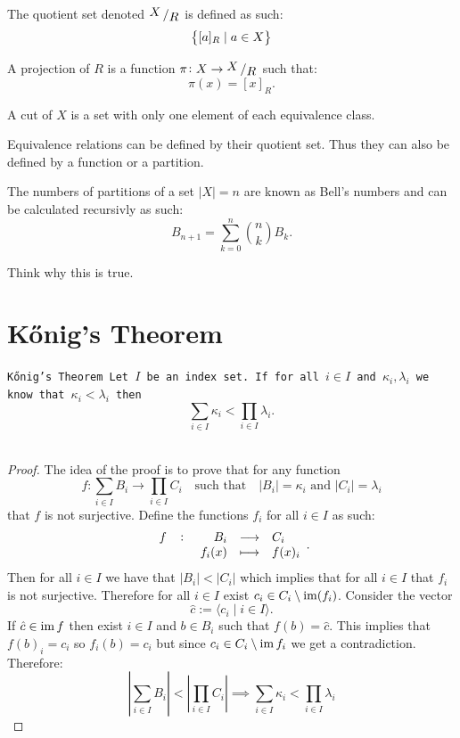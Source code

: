 \documentclass[11pt,a4paper]{article}
\begin{document}
    \begin{definition}
			The quotient set denoted $\bigslant{X}{R}$ is defined as such:
			\[
        \set{[a]_R \mid a \in X}
			\]
		\end{definition}

    \begin{definition}[Projection]
			A projection of $R$ is a function $\pi \colon X \to \bigslant{X}{R}$
      such that:
			\[
				\pi(x) = [x]_R.
			\]
		\end{definition}

    \begin{definition}[Cut]
			A cut of $X$ is a set with only one element of each 
			equivalence class.
		\end{definition}
	\noindent Equivalence relations can be defined by their quotient set.
	Thus they can also be defined by a function or a partition.
	
  \begin{definition}
  The numbers of partitions of a set $|X|=n$ are known as Bell's numbers 
	and can be calculated recursivly as such:
	\[
    B_{n+1} = \sum_{k=0}^{n} \binom{n}{k} B_k.
	\]
  \end{definition}
	
  Think why this is true.
	
\newpage
\section{Kőnig's Theorem}
  \begin{theorem}\tt{Kőnig's Theorem}
  Let $I$ be an index set. If for all $i \in I$ and 
	$\kappa_i, \lambda_i$ we know that $\kappa_i < \lambda_i$ then
	\[
		\sum_{i\in I} \kappa_i < \prod_{i\in I} \lambda_i.
	\]
	\end{theorem}

  \begin{proof}
    The idea of the proof is to prove that for any function
    \[
      f \colon \sum_{i\in I}{B_i} \to \prod_{i\in I}{C_i} 
      \quad\text{such that}\quad
      |B_i| = \kappa_i \text{ and } |C_i| = \lambda_i
    \]
    that $f$ is not surjective.
    Define the functions $f_i$ for all $i \in I$ as such:
    \[
      \fullfunction{f}{B_i}{C_i}{f_i(x)}{f(x)_i}.
    \]
    Then for all $i \in I$ we have that $|B_i| < |C_i|$
    which implies that for all $i \in I$ that $f_i$ is not surjective.
    Therefore for all $i \in I$ exist 
    $c_i \in C_i \setminus \operatorname{im}(f_i)$.
    Consider the vector
    \[
      \hat{c} := \langle c_i \mid i \in I \rangle.
    \]
    If $\hat{c} \in \operatorname{im} f$ then exist $i \in I$ and 
    $b \in B_i$ such that $f(b) = \hat{c}$.
    This implies that $f(b)_i = c_i$
    so $f_i(b) = c_i$ but since $c_i \in C_i \setminus \operatorname{im} f_i$
    we get a contradiction.
    Therefore: 
    \[
      \left| \sum_{i\in I} B_i \right| <
      \left|\prod_{i\in I} C_i \right| 
      \implies
      \sum_{i\in I}{\kappa_i} < \prod_{i\in I}{\lambda_i}
    \]
  \end{proof}
\end{document}
